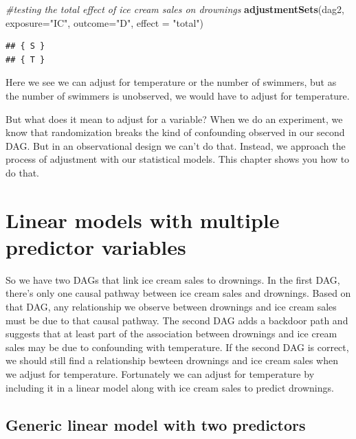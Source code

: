 \documentclass[
]{book}
\newenvironment{Shaded}{\begin{snugshade}}{\end{snugshade}}
\newcommand{\AttributeTok}[1]{\textcolor[rgb]{0.13,0.29,0.53}{#1}}
\newcommand{\CommentTok}[1]{\textcolor[rgb]{0.56,0.35,0.01}{\textit{#1}}}
\newcommand{\FunctionTok}[1]{\textcolor[rgb]{0.13,0.29,0.53}{\textbf{#1}}}
\newcommand{\NormalTok}[1]{#1}
\newcommand{\StringTok}[1]{\textcolor[rgb]{0.31,0.60,0.02}{#1}}
\begin{document}
\begin{Shaded}
\begin{Highlighting}[]
\CommentTok{\#testing the total effect of ice cream sales on drownings}
\FunctionTok{adjustmentSets}\NormalTok{(dag2, }\AttributeTok{exposure=}\StringTok{"IC"}\NormalTok{, }\AttributeTok{outcome=}\StringTok{"D"}\NormalTok{, }\AttributeTok{effect =} \StringTok{"total"}\NormalTok{)}
\end{Highlighting}
\end{Shaded}

\begin{verbatim}
## { S }
## { T }
\end{verbatim}

Here we see we can adjust for temperature or the number of swimmers, but as the number of swimmers is unobserved, we would have to adjust for temperature.

But what does it mean to adjust for a variable? When we do an experiment, we know that randomization breaks the kind of confounding observed in our second DAG. But in an observational design we can't do that. Instead, we approach the process of adjustment with our statistical models. This chapter shows you how to do that.

\section{Linear models with multiple predictor variables}\label{linear-models-with-multiple-predictor-variables}

So we have two DAGs that link ice cream sales to drownings. In the first DAG, there's only one causal pathway between ice cream sales and drownings. Based on that DAG, any relationship we observe between drownings and ice cream sales must be due to that causal pathway. The second DAG adds a backdoor path and suggests that at least part of the association between drownings and ice cream sales may be due to confounding with temperature. If the second DAG is correct, we should still find a relationship bewteen drownings and ice cream sales when we adjust for temperature. Fortunately we can adjust for temperature by including it in a linear model along with ice cream sales to predict drownings.

\subsection{Generic linear model with two predictors}\label{generic-linear-model-with-two-predictors}
\end{document}
